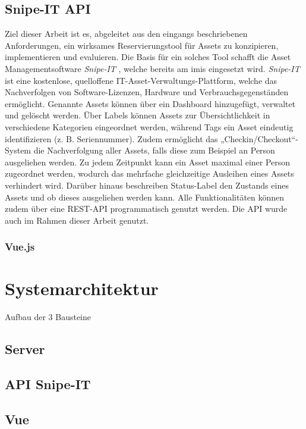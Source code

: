 \subsection{Snipe-IT API}
Ziel dieser Arbeit ist es, abgeleitet aus den eingangs beschriebenen Anforderungen, ein wirksames
Reservierungstool für Assets zu konzipieren, implementieren und evaluieren. Die Basis für ein
solches Tool schafft die Asset Managementsoftware \textit{Snipe-IT} \cite{noauthor_home_nodate},
welche bereits am \ac{imis} eingesetzt wird. \textit{Snipe-IT} ist eine kostenlose, quelloffene
IT-Asset-Verwaltungs-Plattform, welche das Nachverfolgen von Software-Lizenzen, Hardware und
Verbrauchsgegenständen ermöglicht. Genannte Assets können über ein Dashboard hinzugefügt, verwaltet
und gelöscht werden. Über Labels können Assets zur Übersichtlichkeit in verschiedene Kategorien
eingeordnet werden, während Tags ein Asset eindeutig identifizieren (z. B. Seriennummer). Zudem
ermöglicht das „Checkin/Checkout“-System die Nachverfolgung aller Assets, falls diese zum Beispiel
an Person ausgeliehen werden. Zu jedem Zeitpunkt kann ein Asset maximal einer Person zugeordnet
werden, wodurch das mehrfache gleichzeitige Ausleihen eines Assets verhindert wird. Darüber hinaus
beschreiben Status-Label den Zustands eines Assets und ob dieses ausgeliehen werden kann. Alle
Funktionalitäten können zudem über eine REST-API programmatisch genutzt werden. Die API wurde auch im
Rahmen dieser Arbeit genutzt. 

\subsubsection{Vue.js}

\section{Systemarchitektur}
Aufbau der 3 Bausteine

\subsection{Server}


\subsection{API Snipe-IT}


\subsection{Vue}

